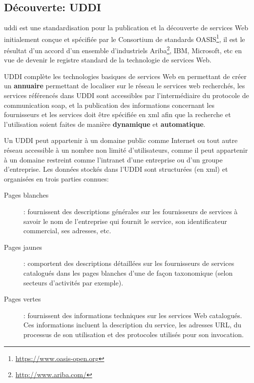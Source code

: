   \subsection{Découverte: UDDI}
  \label{sec:uddi}
  \acrshort{uddi} \cite{clement2004uddi} est une standardisation pour
  la publication et la découverte de services Web initialement conçue
  et spécifiée par le Consortium de standards
  OASIS\footnote{\url{https://www.oasis-open.org}}, il est le résultat
  d'un accord d'un ensemble d'industriels
  Ariba\footnote{\url{http://www.ariba.com/}}, IBM, Microsoft, etc en
  vue de devenir le registre standard de la technologie de services
  Web. \medskip

  \textsc{UDDI} complète les technologies basiques de services Web en
  permettant de créer un \textbf{annuaire} permettant de localiser sur
  le réseau le services web recherchés, les services référencés dans
  \textsc{UDDI} sont accessibles par l'intermédiaire du protocole de
  communication \acrshort{soap}, et la publication des informations
  concernant les fournisseurs et les services doit être spécifiée en
  \acrshort{xml} afin que la recherche et l'utilisation soient faites de
  manière \textbf{dynamique} et \textbf{automatique}.\medskip

  Un \textsc{UDDI} peut appartenir à un domaine public comme Internet
  ou tout autre réseau accessible à un nombre non limité
  d'utilisateurs, comme il peut appartenir à un domaine restreint
  comme l'intranet d'une entreprise ou d'un groupe d'entreprise. Les
  données stockés dans l'\textsc{UDDI} sont structurées (en
  \acrshort{xml}) et organisées en trois parties connues:

  \SpecialItem
  \renewcommand{\descriptionlabel}[1]{\hspace{0.5cm}\texttt{#1}}
  \begin{description}
    \item[Pages blanches]: fournissent des descriptions générales sur
      les fournisseurs de services à savoir le nom de l'entreprise qui
      fournit le service, son identificateur commercial, ses adresses,
      etc.

    \item[Pages jaunes]: comportent des descriptions détaillées sur
      les fournisseurs de services catalogués dans les pages blanches
      d'une de façon taxonomique (selon secteurs d'activités par
      exemple).

    \item[Pages vertes]: fournissent des informations techniques sur
      les services Web catalogués. Ces informations incluent la
      description du service, les adresses \textsc{URL}, du processus
      de son utilisation et des protocoles utilisés pour son
      invocation.
  \end{description}

